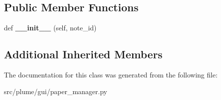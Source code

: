 \subsection*{Public Member Functions}
\begin{DoxyCompactItemize}
\item 
def {\bfseries \+\_\+\+\_\+init\+\_\+\+\_\+} (self, note\+\_\+id)\hypertarget{classplume-creator_1_1src_1_1plume_1_1gui_1_1paper__manager_1_1_note_paper_aed1f41200d0596a675fa3b6dccbdd689}{}\label{classplume-creator_1_1src_1_1plume_1_1gui_1_1paper__manager_1_1_note_paper_aed1f41200d0596a675fa3b6dccbdd689}

\end{DoxyCompactItemize}
\subsection*{Additional Inherited Members}


The documentation for this class was generated from the following file\+:\begin{DoxyCompactItemize}
\item 
src/plume/gui/paper\+\_\+manager.\+py\end{DoxyCompactItemize}
